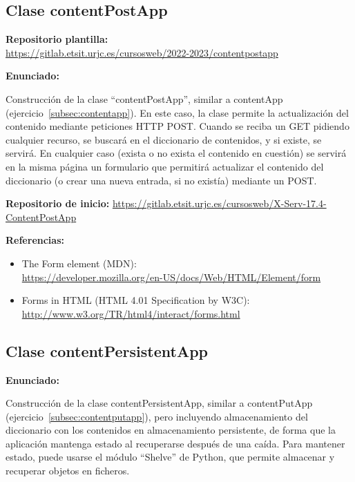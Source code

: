 \subsection{Clase contentPostApp}
\label{subsec:contentpostapp}

\textbf{Repositorio plantilla:} \\
\url{https://gitlab.etsit.urjc.es/cursosweb/2022-2023/contentpostapp}

\textbf{Enunciado:}

Construcción de la clase ``contentPostApp'', similar a contentApp (ejercicio~\ref{subsec:contentapp}). En este caso, la clase permite la actualización del contenido mediante peticiones HTTP POST. Cuando se reciba un GET pidiendo cualquier recurso, se buscará en el diccionario de contenidos, y si existe, se servirá. En cualquier caso (exista o no exista el contenido en cuestión) se servirá en la misma página un formulario que permitirá actualizar el contenido del diccionario (o crear una nueva entrada, si no existía) mediante un POST.

\textbf{Repositorio de inicio:} \url{https://gitlab.etsit.urjc.es/cursosweb/X-Serv-17.4-ContentPostApp}

\textbf{Referencias:}

\begin{itemize}
\item The Form element (MDN): \\
  \url{https://developer.mozilla.org/en-US/docs/Web/HTML/Element/form}
\item Forms in HTML (HTML 4.01 Specification by W3C): \\
\url{http://www.w3.org/TR/html4/interact/forms.html}
\end{itemize}

\subsection{Clase contentPersistentApp}
\label{subsec:contentpersistentapp}

\textbf{Enunciado:}

Construcción de la clase contentPersistentApp, similar a contentPutApp (ejercicio~\ref{subsec:contentputapp}), pero incluyendo almacenamiento del diccionario con los contenidos en almacenamiento persistente, de forma que la aplicación mantenga estado al recuperarse después de una caída. Para mantener estado, puede usarse el módulo ``Shelve'' de Python, que permite almacenar y recuperar objetos en ficheros.

